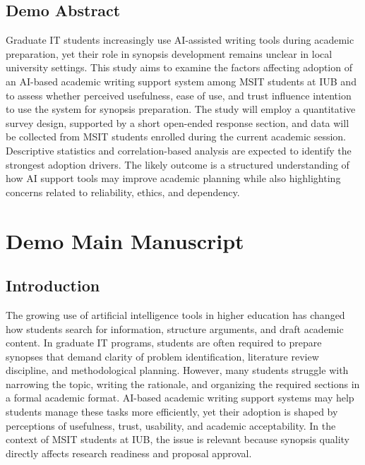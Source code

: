 \documentclass[11pt,a4paper]{article}
\begin{document}
\subsection{Demo Abstract}

\begin{examplebox}
Graduate IT students increasingly use AI-assisted writing tools during academic preparation, yet their role in synopsis development remains unclear in local university settings. This study aims to examine the factors affecting adoption of an AI-based academic writing support system among MSIT students at IUB and to assess whether perceived usefulness, ease of use, and trust influence intention to use the system for synopsis preparation. The study will employ a quantitative survey design, supported by a short open-ended response section, and data will be collected from MSIT students enrolled during the current academic session. Descriptive statistics and correlation-based analysis are expected to identify the strongest adoption drivers. The likely outcome is a structured understanding of how AI support tools may improve academic planning while also highlighting concerns related to reliability, ethics, and dependency.
\end{examplebox}

\section{Demo Main Manuscript}

\subsection{Introduction}

The growing use of artificial intelligence tools in higher education has changed how students search for information, structure arguments, and draft academic content. In graduate IT programs, students are often required to prepare synopses that demand clarity of problem identification, literature review discipline, and methodological planning. However, many students struggle with narrowing the topic, writing the rationale, and organizing the required sections in a formal academic format. AI-based academic writing support systems may help students manage these tasks more efficiently, yet their adoption is shaped by perceptions of usefulness, trust, usability, and academic acceptability. In the context of MSIT students at IUB, the issue is relevant because synopsis quality directly affects research readiness and proposal approval.
\end{document}
